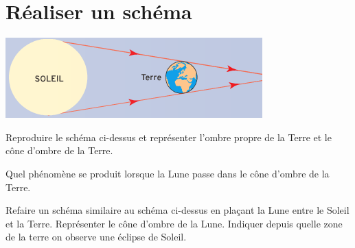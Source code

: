 \documentclass[a4paper,11pt]{exam}
\begin{document}
\section{Réaliser un schéma}

\begin{center}
	\includegraphics[scale=1]{img/schema2}
	
\end{center}

\begin{questions}
	\question[2] Reproduire le schéma ci-dessus et représenter l'ombre propre de la Terre et le cône d'ombre de la Terre.
	
	\makeemptybox{5cm}
	
	\question[2] Quel phénomène se produit lorsque la Lune passe dans le cône d'ombre de la Terre.
	
	\fillwithdottedlines{3cm}
	
	\question[4] Refaire un schéma similaire au schéma ci-dessus en plaçant la Lune entre le Soleil et la Terre. Représenter le cône d'ombre de la Lune. Indiquer depuis quelle zone de la terre on observe une éclipse de Soleil.
	
	\makeemptybox{5cm}
	
	
\end{questions}


\ \label{LastPage}
\end{document}
